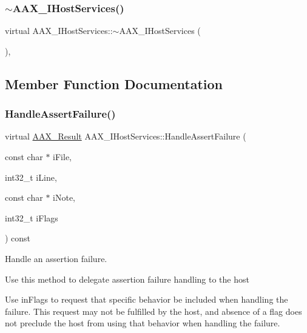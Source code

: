 \subsubsection{\texorpdfstring{$\sim$AAX\_IHostServices()}{~AAX\_IHostServices()}}
{\footnotesize\ttfamily virtual A\+A\+X\+\_\+\+I\+Host\+Services\+::$\sim$\+A\+A\+X\+\_\+\+I\+Host\+Services (\begin{DoxyParamCaption}{ }\end{DoxyParamCaption})\hspace{0.3cm}{\ttfamily [inline]}, {\ttfamily [virtual]}}



\subsection{Member Function Documentation}
\mbox{\label{a01841_a0ee94b4e4e98eed868a28f39d6fbe675}} 
\subsubsection{\texorpdfstring{HandleAssertFailure()}{HandleAssertFailure()}}
{\footnotesize\ttfamily virtual \mbox{\hyperlink{a00392_a4d8f69a697df7f70c3a8e9b8ee130d2f}{A\+A\+X\+\_\+\+Result}} A\+A\+X\+\_\+\+I\+Host\+Services\+::\+Handle\+Assert\+Failure (\begin{DoxyParamCaption}\item[{const char $\ast$}]{i\+File,  }\item[{int32\+\_\+t}]{i\+Line,  }\item[{const char $\ast$}]{i\+Note,  }\item[{int32\+\_\+t}]{i\+Flags }\end{DoxyParamCaption}) const\hspace{0.3cm}{\ttfamily [pure virtual]}}



Handle an assertion failure. 

Use this method to delegate assertion failure handling to the host

Use {\ttfamily in\+Flags} to request that specific behavior be included when handling the failure. This request may not be fulfilled by the host, and absence of a flag does not preclude the host from using that behavior when handling the failure.


